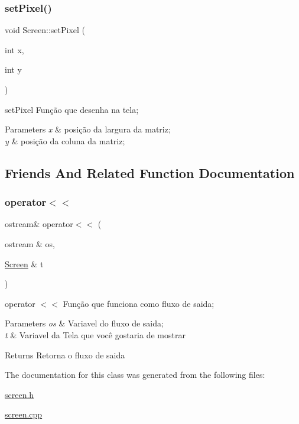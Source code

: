 \subsubsection{\texorpdfstring{set\+Pixel()}{setPixel()}}
{\footnotesize\ttfamily void Screen\+::set\+Pixel (\begin{DoxyParamCaption}\item[{int}]{x,  }\item[{int}]{y }\end{DoxyParamCaption})}



set\+Pixel Função que desenha na tela; 


\begin{DoxyParams}{Parameters}
{\em x} & posição da largura da matriz; \\
\hline
{\em y} & posição da coluna da matriz; \\
\hline
\end{DoxyParams}


\subsection{Friends And Related Function Documentation}
\mbox{\label{class_screen_aab6a2880746bfe1b7964817cc8f0989e}} 
\subsubsection{\texorpdfstring{operator$<$$<$}{operator<<}}
{\footnotesize\ttfamily ostream\& operator$<$$<$ (\begin{DoxyParamCaption}\item[{ostream \&}]{os,  }\item[{\mbox{\hyperlink{class_screen}{Screen}} \&}]{t }\end{DoxyParamCaption})\hspace{0.3cm}{\ttfamily [friend]}}



operator $<$$<$ Função que funciona como fluxo de saida; 


\begin{DoxyParams}{Parameters}
{\em os} & Variavel do fluxo de saida; \\
\hline
{\em t} & Variavel da Tela que você gostaria de mostrar \\
\hline
\end{DoxyParams}
\begin{DoxyReturn}{Returns}
Retorna o fluxo de saida 
\end{DoxyReturn}


The documentation for this class was generated from the following files\+:\begin{DoxyCompactItemize}
\item 
\mbox{\hyperlink{screen_8h}{screen.\+h}}\item 
\mbox{\hyperlink{screen_8cpp}{screen.\+cpp}}\end{DoxyCompactItemize}
